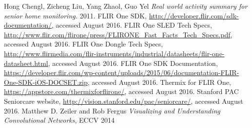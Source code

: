 \documentclass[oneside, twocolumn]{article}
\begin{document}
\begin{thebibliography}{99}

 Hong Chengl, Zicheng Liu, Yang Zhaol, Guo Yel  {\em Real world activity summary for senior home monitoring.}  2011.
FLIR One SDK, {\url{http://developer.flir.com/sdk-documentation/}}, accessed August 2016.
FLIR One SLED Tech Specs, {\url{http://www.flir.com/flirone/press/FLIRONE_Fast_Facts_Tech_Specs.pdf}}, accessed August 2016.
FLIR One Dongle Tech Specs, {\url{http://www.flirmedia.com/flir-instruments/industrial/datasheets/flir-one-datasheet.html}}, accessed August 2016.
FLIR One SDK Documentation, {\url{https://developer.flir.com/wp-content/uploads/2015/06/documentation-FLIR-One-SDK-iOS-DOCSET.zip}}, accessed August 2016.
Thermix for FLIR One, {\url{https://appstore.com/thermixforflirone/}}, accessed August 2016.
 Stanford PAC Seniorcare website, {\url{http://vision.stanford.edu/pac/seniorcare/}}, accessed August 2016.
 Matthew D. Zeiler and Rob Fergus {\em Visualizing and Understanding Convolutional Networks}, ECCV 2014

\end{thebibliography}

\end{document}
